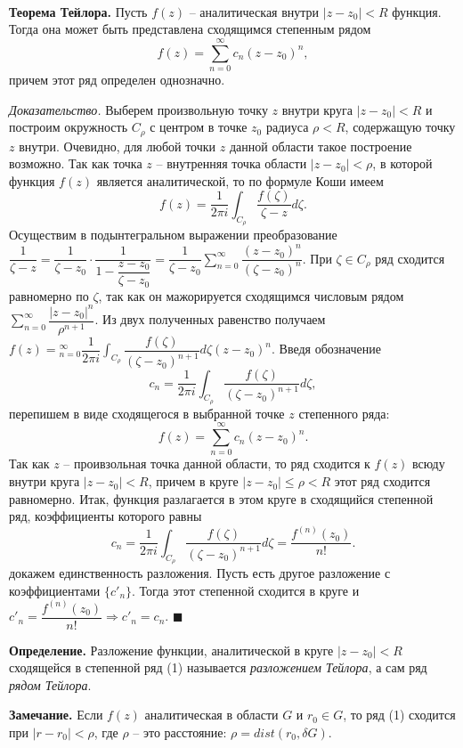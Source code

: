 \documentclass[9pt]{article}
\begin{document}
\ 
\par\textbf{Теорема Тейлора.} Пусть \(f(z)\) -- аналитическая внутри \(|z-z_0|<R\) функция. Тогда она может быть представлена сходящимся степенным рядом
\begin{equation}
    f(z)=\sum_{n=0}^\infty c_n(z-z_0)^n,
\end{equation}
причем этот ряд определен однозначно.
\par\textit{Доказательство.} Выберем произвольную точку \(z\) внутри круга \(|z-z_0|<R\) и построим окружность \(C_\rho\) с центром в точке \(z_0\) радиуса \(\rho<R\), содержащую точку \(z\) внутри. Очевидно, для любой точки \(z\) данной области такое построение возможно. Так как точка \(z\) -- внутренняя точка области \(|z-z_0|<\rho\), в которой функция \(f(z)\) является аналитической, то по формуле Коши имеем \[f(z)=\dfrac{1}{2\pi i}\int_{C_\rho}\dfrac{f(\zeta)}{\zeta-z}d\zeta.\]
Осуществим в подынтегральном выражении преобразование \(\dfrac{1}{\zeta - z}=\dfrac{1}{\zeta - z_0}\cdot\dfrac{1}{1-\dfrac{z-z_0}{\zeta-z_0}}=\dfrac{1}{\zeta-z_0}\sum_{n=0}^\infty\dfrac{(z-z_0)^n}{(\zeta-z_0)^n}.\)
При \(\zeta\in C_\rho\) ряд сходится равномерно по \(\zeta\), так как он мажорируется сходящимся числовым рядом \(\displaystyle\sum_{n=0}^\infty\dfrac{|z-z_0|^n}{\rho^{n+1}}\). Из двух полученных равенство получаем \(f(z)=\displaystyle_{n=0}^\infty\dfrac{1}{2\pi i}\int_{C_\rho}\dfrac{f(\zeta)}{(\zeta-z_0)^{n+1}}d\zeta(z-z_0)^n.\) Введя обозначение \[c_n=\dfrac{1}{2\pi i}\int_{C_\rho}\dfrac{f(\zeta)}{(\zeta-z_0)^{n+1}}d\zeta,\] перепишем в виде сходящегося в выбранной точке \(z\) степенного ряда:
\[f(z)=\displaystyle\sum_{n=0}^\infty c_n(z-z_0)^n.\] Так как \(z\) -- проивзольная точка данной области, то ряд сходится к \(f(z)\) всюду внутри круга \(|z-z_0|<R\), причем в круге \(|z-z_0|\le\rho<R\) этот ряд сходится равномерно. Итак, функция разлагается в этом круге в сходящийся степенной ряд, коэффициенты которого равны
\[c_n=\dfrac{1}{2\pi i}\int_{C_\rho}\dfrac{f(\zeta)}{(\zeta-z_0)^{n+1}}d\zeta=\dfrac{f^{(n)}(z_0)}{n!}.\]
\parТеперь докажем единственность разложения. Пусть есть другое разложение с коэффициентами \(\{c'_n\}\). Тогда этот степенной сходится в круге и \(c'_n=\dfrac{f^{(n)}(z_0)}{n!}\Rightarrow c'_n=c_n\). \(\blacksquare\)
\par\textbf{Определение.} Разложение функции, аналитической в круге \(|z-z_0|<R\) сходящейся в степенной ряд (1) называется \textit{разложением Тейлора}, а сам ряд \textit{рядом Тейлора}.
\par\textbf{Замечание.} Если \(f(z)\) аналитическая в области \(G\) и \(r_0\in G\), то ряд (1) сходится при \(|r-r_0|<\rho\), где \(\rho\) -- это расстояние: \(\rho=dist(r_0,\delta G)\).
\end{document}
